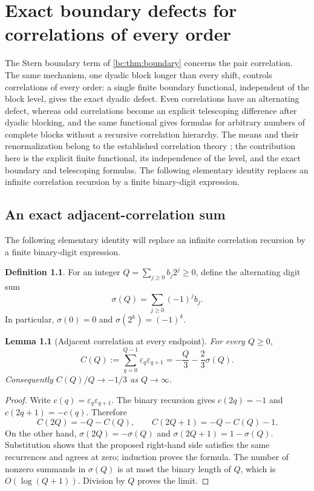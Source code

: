 \documentclass[11pt,a4paper,oneside,openany]{book}
\numberwithin{equation}{chapter}
\newtheorem{lemma}[theorem]{Lemma}
\theoremstyle{definition}
\newtheorem{definition}[theorem]{Definition}
\theoremstyle{remark}
\newcommand{\eps}{\varepsilon}
\begin{document}
\chapter{Exact boundary defects for correlations of every order}
\label{nd:sec:correlations}
The Stern boundary term of \cref{bc:thm:boundary} concerns the pair
correlation. The same mechanism, one dyadic block longer than every shift,
controls correlations of every order: a single finite boundary functional,
independent of the block level, gives the exact dyadic defect. Even
correlations have an alternating defect, whereas odd correlations become an
explicit telescoping difference after dyadic blocking, and the same
functional gives formulas for arbitrary numbers of complete blocks without a
recursive correlation hierarchy. The means and their renormalization belong
to the established correlation theory \cite{baake-coons}; the contribution
here is the explicit finite functional, its independence of the level, and
the exact boundary and telescoping formulas. The following elementary
identity replaces an infinite correlation recursion by a finite binary-digit
expression.


\section{An exact adjacent-correlation sum}
The following elementary identity will replace an infinite correlation
recursion by a finite binary-digit expression.

\begin{definition}
For an integer \(Q=\sum_{j\ge0}b_j2^j\ge0\), define the alternating digit sum
\begin{equation}
 \sigma(Q)=\sum_{j\ge0}(-1)^jb_j.
 \label{nd:eq:sigma}
\end{equation}
In particular, \(\sigma(0)=0\) and \(\sigma(2^k)=(-1)^k\).
\end{definition}

\begin{lemma}[Adjacent correlation at every endpoint]
For every \(Q\ge0\),
\begin{equation}
 C(Q):=\sum_{q=0}^{Q-1}\eps_q\eps_{q+1}
       =-\frac Q3-\frac23\sigma(Q).
 \label{nd:eq:C}
\end{equation}
Consequently \(C(Q)/Q\to-1/3\) as \(Q\to\infty\).
\end{lemma}
\begin{proof}
Write \(c(q)=\eps_q\eps_{q+1}\). The binary recursion gives
\(c(2q)=-1\) and \(c(2q+1)=-c(q)\). Therefore
\[
 C(2Q)=-Q-C(Q),\qquad C(2Q+1)=-Q-C(Q)-1.
\]
On the other hand,
\(\sigma(2Q)=-\sigma(Q)\) and
\(\sigma(2Q+1)=1-\sigma(Q)\). Substitution shows that the proposed right-hand
side satisfies the same recurrences and agrees at zero; induction proves the
formula. The number of nonzero summands in \(\sigma(Q)\) is at most the binary
length of \(Q\), which is \(O(\log(Q+1))\). Division by \(Q\) proves the limit.
\end{proof}
\end{document}
